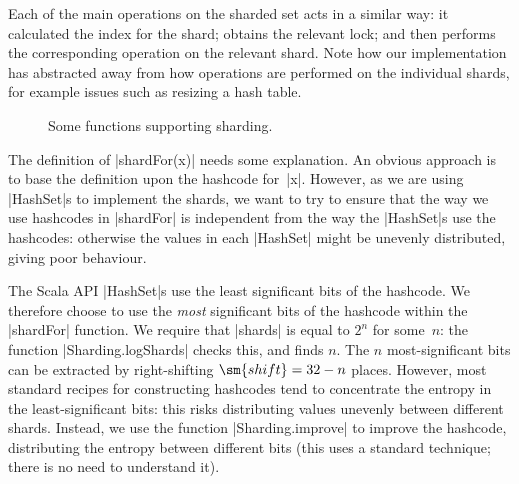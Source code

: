 Each of the main operations on the sharded set acts in a similar way: it
calculated the index for the shard; obtains the relevant lock; and then
performs the corresponding operation on the relevant shard.  Note how our
implementation has abstracted away from how operations are performed on the
individual shards, for example issues such as resizing a hash table. 


\begin{figure}
\caption{Some functions supporting sharding.}
\label{fig:Sharding}
\end{figure}


The definition of |shardFor(x)| needs some explanation.  An obvious approach
is to base the definition upon the hashcode for~|x|.  However, as we are using
|HashSet|s to implement the shards, we want to try to ensure that the way we
use hashcodes in |shardFor| is independent from the way the |HashSet|s use the
hashcodes: otherwise the values in each |HashSet| might be unevenly
distributed, giving poor behaviour.

The Scala API |HashSet|s use the least significant bits of the hashcode.  We
therefore choose to use the \emph{most} significant bits of the hashcode
within the |shardFor| function.  We require that |shards| is equal to $2^n$
for some~$n$: the function |Sharding.logShards| checks this, and finds $n$.
The $n$ most-significant bits can be extracted by right-shifting $\sm{shift} =
32-n$ places.  However, most standard recipes for constructing hashcodes tend
to concentrate the entropy in the least-significant bits: this risks
distributing values unevenly between different shards.  Instead, we use the
function |Sharding.improve| to improve the hashcode, distributing the entropy
between different bits (this uses a standard technique; there is no need to
understand it).


